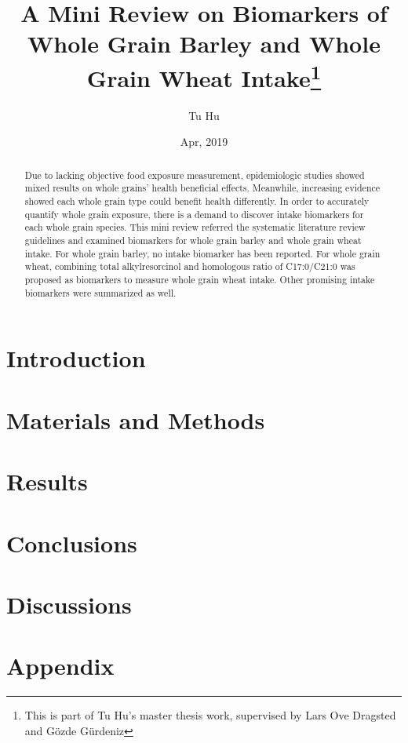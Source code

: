 \documentclass[]{article}
\title{A Mini Review on Biomarkers of Whole Grain Barley and Whole Grain Wheat Intake\footnote{This is part of Tu Hu's master thesis work, supervised by Lars Ove Dragsted and Gözde Gürdeniz}}
\author{Tu Hu}
\date{Apr, 2019}
\begin{document}
\maketitle

\begin{abstract}
Due to lacking objective food exposure measurement, epidemiologic studies showed mixed results on whole grains' health beneficial effects.
Meanwhile, increasing evidence showed each whole grain type could benefit health differently. 
In order to accurately quantify whole grain exposure, there is a demand to discover intake biomarkers for each whole grain species.
This mini review referred the systematic literature review guidelines and examined biomarkers for whole grain barley and whole grain wheat intake.
For whole grain barley, no intake biomarker has been reported.
For whole grain wheat, combining total alkylresorcinol and homologous ratio of C17:0/C21:0 was proposed as biomarkers to measure whole grain wheat intake.
Other promising intake biomarkers were summarized as well.

\end{abstract}

\section{Introduction}


\section{Materials and Methods}


\section{Results}



\section{Conclusions}


\section{Discussions}


\newpage
\section{Appendix}


\clearpage
\printbibliography[
heading=bibintoc,
title={References}
]
\end{document}
